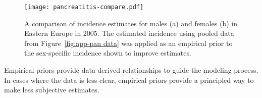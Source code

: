     \begin{figure}[h]
        \begin{center}
            \texttt{[image: pancreatitis-compare.pdf]}
            \caption{A comparison of incidence estimates for males (a) and
              females (b) in Eastern Europe in 2005.  The estimated incidence 
              using pooled data from Figure~\ref{fig:app-pan data} was applied 
              as an empirical prior to the sex-specific incidence shown to 
              improve estimates.}
            \label{fig:app-pan compare}
        \end{center}
    \end{figure}

Empirical priors provide data-derived relationships to guide the modeling process.
In cases where the data is less clear, empirical priors provide a principled 
way to make less subjective estimates.  